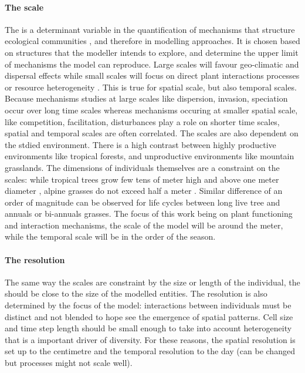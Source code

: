 \paragraph{The scale}
The  is a determinant variable in the quantification of mechanisms that structure ecological communities \cite{bello_hierarchical_2013}, and therefore in modelling approaches. It is chosen based on structures that the modeller intends to explore, and determine the upper limit of mechanisms the model can reproduce. Large scales will favour geo-climatic and dispersal effects \cite{kleidon_global_2000} while small scales will focus on direct plant interactions processes or resource heterogeneity \cite{ soussana_gemini:_2012, maire_plasticity_2013, taubert_modelling_2014}. This is true for spatial scale, but also temporal scales. Because mechanisms studies at large scales like dispersion, invasion, speciation occur over long time scales whereas mechanisms occuring at smaller spatial scale, like competition, facilitation, disturbances play a role on shorter time scales, spatial and temporal scales are often correlated. The scales are also dependent on the stdied environment. There is a high contrast between highly productive environments like tropical forests, and unproductive environments like mountain grasslands. The dimensions of individuals themselves are a constraint on the scales: while tropical trees grow few tens of meter high and above one meter diameter \cite{}, alpine grasses do not exceed half a meter \cite{korner_alpine_2011}. Similar difference of an order of magnitude can be observed for life cycles between long live tree and annuals or bi-annuals grasses. The focus of this work being on plant functioning and interaction mechanisms, the scale of the model will be around the meter, while the temporal scale will be in the order of the season.

\paragraph{The resolution} The same way the scales are constraint by the size or length of the individual, the  should be close to the size of the modelled entities. The resolution is also determined by the focus of the model: interactions between individuals must be distinct and not blended to hope see the emergence of spatial patterns. Cell size and time step length should be small enough to take into account heterogeneity that is a important driver of diversity. For these reasons, the spatial resolution is set up to the centimetre and the temporal resolution to the day (can be changed but processes might not scale well).

